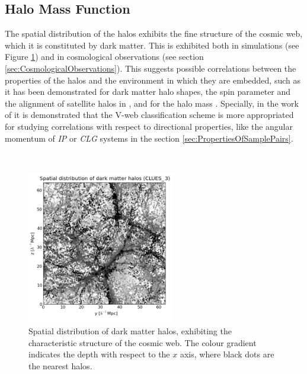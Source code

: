 	\subsection{Halo Mass Function}
	\label{subsec:Halos_Properties}


The spatial distribution of the halos exhibits the fine structure of the 
cosmic web, which it is constituted by dark matter. This is exhibited both 
in simulations (see Figure \ref{fig:Halos_Web}) and in cosmological 
observations (see section \ref{sec:CosmologicalObservations}). This 
suggests possible correlations between the properties of the halos and the
environment in which they are embedded, such as it has been demonstrated 
for dark matter halo shapes, the spin parameter and the alignment of 
satellite halos in \cite{libeskind2013}, and for the halo mass 
\cite{lemson1999}. Specially, in the work of \cite{libeskind2013} it is
demonstrated that the V-web classification scheme is more appropriated for
studying correlations with respect to directional properties, like the 
angular momentum of \textit{IP} or \textit{CLG} systems in the section 
\ref{sec:PropertiesOfSamplePairs}.


\
\begin{figure}[htbp]
	\centering
	\includegraphics[width=0.58\textwidth]
	{./figures/3_nbody_simulations/Halos_Spatial_Distribution(CLUES_16953).png}

	\caption{\small{Spatial distribution of dark matter halos, exhibiting
	the	characteristic structure of the cosmic web. The colour gradient 
	indicates the depth with respect to the $x$ axis, where black dots 
	are the nearest halos.}}
	
	\label{fig:Halos_Web}
\end{figure}



